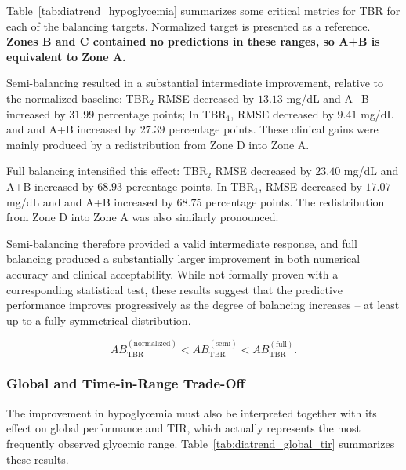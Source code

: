 Table~\ref{tab:diatrend_hypoglycemia} summarizes some critical metrics for TBR for each of the balancing targets. Normalized target is presented as a reference. \textbf{Zones B and C contained no predictions in these ranges, so A+B is equivalent to Zone A.}

Semi-balancing resulted in a substantial intermediate improvement, relative to the normalized baseline: TBR$_2$ RMSE decreased by \(13.13\) mg/dL and A+B increased by \(31.99\) percentage points; In TBR$_1$, RMSE decreased by \(9.41\) mg/dL and and A+B increased by \(27.39\) percentage points. These clinical gains were mainly produced by a redistribution from Zone D into Zone A.

Full balancing intensified this effect: TBR$_2$ RMSE decreased by \(23.40\) mg/dL and A+B increased by \(68.93\) percentage points. In TBR$_1$, RMSE decreased by \(17.07\) mg/dL and and A+B increased by \(68.75\) percentage points. The redistribution from Zone D into Zone A was also similarly pronounced.

Semi-balancing therefore provided a valid intermediate response, and full balancing produced a substantially larger improvement in both numerical accuracy and clinical acceptability. While not formally proven with a corresponding statistical test, these results suggest that the predictive performance improves progressively as the degree of balancing increases -- at least up to a fully symmetrical distribution.

\begin{equation}
\label{eq:ordered_hypothesis_conjecture}
AB_{\mathrm{TBR}}^{(\mathrm{normalized})}
<
AB_{\mathrm{TBR}}^{(\mathrm{semi})}
<
AB_{\mathrm{TBR}}^{(\mathrm{full})}.
\end{equation}


\subsubsection{Global and Time-in-Range Trade-Off}
\label{subsubsec:diatrend_global_tir}

The improvement in hypoglycemia must also be interpreted together with its effect on global performance and TIR, which actually represents the most frequently observed glycemic range. Table~\ref{tab:diatrend_global_tir} summarizes these results.

